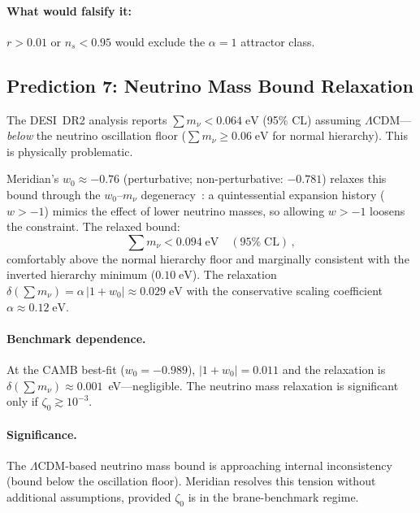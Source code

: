 \paragraph{What would falsify it:} $r > 0.01$ or $n_s < 0.95$ would exclude the $\alpha = 1$ attractor class.

\subsection{Prediction 7: Neutrino Mass Bound Relaxation}
\label{sec:2-pred7}

The DESI~DR2 analysis reports $\sum m_\nu < 0.064\;\mathrm{eV}$ (95\% CL) assuming $\Lambda$CDM---\emph{below} the neutrino oscillation floor ($\sum m_\nu \geq 0.06\;\mathrm{eV}$ for normal hierarchy). This is physically problematic.

Meridian's $w_0 \approx -0.76$ (perturbative; non-perturbative: $-0.781$) relaxes this bound through the $w_0$--$m_\nu$ degeneracy~\cite{ch2:vagnozzi17}: a quintessential expansion history ($w > -1$) mimics the effect of lower neutrino masses, so allowing $w > -1$ loosens the constraint. The relaxed bound:
\begin{equation}
\label{eq:2-mnu-relaxed}
\sum m_\nu < 0.094\;\mathrm{eV}\quad (95\%\;\mathrm{CL})\,,
\end{equation}
comfortably above the normal hierarchy floor and marginally consistent with the inverted hierarchy minimum ($0.10\;\mathrm{eV}$). The relaxation $\delta(\sum m_\nu) = \alpha\,|1 + w_0| \approx 0.029\;\mathrm{eV}$ with the conservative scaling coefficient $\alpha \approx 0.12\;\mathrm{eV}$.

\paragraph{Benchmark dependence.} At the CAMB best-fit ($w_0 = -0.989$), $|1+w_0| = 0.011$ and the relaxation is $\delta(\sum m_\nu) \approx 0.001$~eV---negligible. The neutrino mass relaxation is significant only if $\zeta_0 \gtrsim 10^{-3}$.

\paragraph{Significance.} The $\Lambda$CDM-based neutrino mass bound is approaching internal inconsistency (bound below the oscillation floor). Meridian resolves this tension without additional assumptions, provided $\zeta_0$ is in the brane-benchmark regime.

